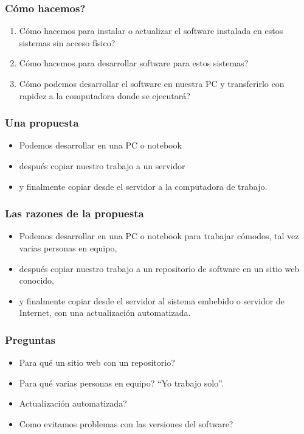 \documentclass{beamer}
\begin{document}

\begin{frame}
\frametitle{\textquestiondown C\'{o}mo hacemos?}

\begin{enumerate}
\item<1-> \textquestiondown C\'{o}mo hacemos para instalar o actualizar el software instalada en estos sistemas sin acceso físico?
\item<2-> \textquestiondown C\'{o}mo hacemos para desarrollar software para estos sistemas?
\item<3-> \textquestiondown C\'{o}mo podemos desarrollar el software en nuestra PC y transferirlo con rapidez a la computadora donde se ejecutará?
\end{enumerate}
\end{frame}


\begin{frame}
\frametitle{Una propuesta}
\begin{itemize}
\item Podemos desarrollar en una PC o notebook
\item despu\'{e}s copiar nuestro trabajo a un servidor
\item y finalmente copiar desde el servidor a la computadora de trabajo. 
\end{itemize}
\end{frame}

\begin{frame}
\frametitle{Las razones de la propuesta}
\begin{itemize}
\item<1-> Podemos desarrollar en una PC o notebook para trabajar c\'{o}modos, tal vez varias personas en equipo,
\item<2-> despu\'{e}s copiar nuestro trabajo a un repositorio de software en un sitio web conocido, 
\item<3-> y finalmente copiar desde el servidor al sistema embebido o servidor de Internet, con una actualizaci\'{o}n automatizada.
\end{itemize}
\end{frame}

\begin{frame}
\frametitle{Preguntas}
\begin{itemize}
\item \textquestiondown Para qu\'{e} un sitio web con un repositorio?
\item \textquestiondown Para qu\'{e} varias personas en equipo? ``Yo trabajo solo''.
\item \textquestiondown Actualizaci\'{o}n automatizada?
\item \textquestiondown Como evitamos problemas con las versiones del software?
\end{itemize}
\end{frame}
\end{document}

